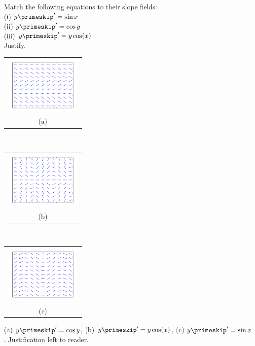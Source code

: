 {Match the following equations to their slope fields:\\
(i) $y\primeskip'=\sin x$\\
(ii) $y\primeskip'=\cos y$\\
(iii) $y\primeskip' = y\cos(x)$ \\
Justify.

\medskip

\begin{tabular}{c}
\includegraphics[width=1.5in]{figures/yprimecosyslope}\\
(a)
\end{tabular}\\
\begin{tabular}{c}
\includegraphics[width=1.5in]{figures/yprimecosxyslope}\\
(b)
\end{tabular}\\
\begin{tabular}{c}
\includegraphics[width=1.5in]{figures/yprimesinxslope}\\
(c)
\end{tabular}
}
{(a) $y\primeskip'=\cos y$,
(b) $y\primeskip' = y\cos(x)$,
(c) $y\primeskip'=\sin x$.
Justification left to reader.}